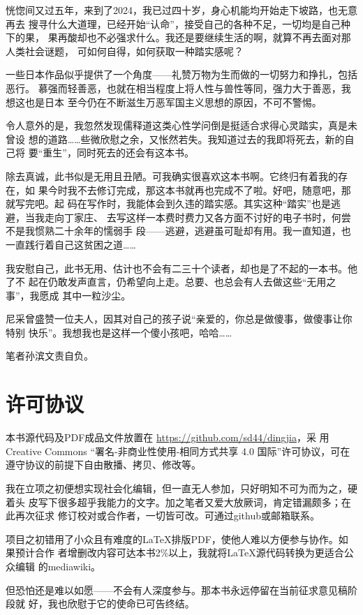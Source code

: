恍惚间又过五年，来到了2024，我已过四十岁，身心机能均开始走下坡路，也无意再去
搜寻什么大道理，已经开始“认命”，接受自己的各种不足，一切均是自己种下的果，
果再酸却也不必强求什么。我还是要继续生活的啊，就算不再去面对那人类社会谜题，
可如何自得，如何获取一种踏实感呢？

一些日本作品似乎提供了一个角度——礼赞万物为生而做的一切努力和挣扎，包括恶行。
慕强而轻善恶，也就在相当程度上将人性与兽性等同，强力大于善恶，我想这也是日本
至今仍在不断滋生万恶军国主义思想的原因，不可不警惕。

令人意外的是，我忽然发现儒释道这类心性学问倒是挺适合求得心灵踏实，真是未曾设
想的道路……些微欣慰之余，又怅然若失。我知道过去的我即将死去，新的自己将
要“重生”，同时死去的还会有这本书。

除去真诚，此书似是无用且丑陋。可我确实很喜欢这本书啊。它终归有着我的存在，如
果今时我不去修订完成，那这本书就再也完成不了啦。好吧，随意吧，那就写完吧。起
码在写作时，我能体会到久违的踏实感。其实这种“踏实”也是逃避，当我走向丁家庄、
去写这样一本费时费力又各方面不讨好的电子书时，何尝不是我惯熟二十余年的懦弱手
段——逃避，逃避虽可耻却有用。我一直知道，也一直践行着自己这贫困之道……

我安慰自己，此书无用、估计也不会有二三十个读者，却也是了不起的一本书。他了不
起在仍敢发声直言，仍希望向上走。总要、也总会有人去做这些“无用之事”，我愿成
其中一粒沙尘。


尼采曾盛赞一位夫人，因其对自己的孩子说“亲爱的，你总是做傻事，做傻事让你特别
快乐”。我想我也是这样一个傻小孩吧，哈哈……

笔者孙滨文责自负。

\section*{许可协议}

本书源代码及PDF成品文件放置在 \url{https://github.com/sd44/dingjia}，采
用 Creative Commons “署名-非商业性使用-相同方式共享 4.0 国际”许可协议，可在
遵守协议的前提下自由散播、拷贝、修改等。

我在立项之初便想实现社会化编辑，但一直无人参加，只好明知不可为而为之，硬着头
皮写下很多超乎我能力的文字。加之笔者又爱大放厥词，肯定错漏颇多；在此再次征求
修订校对或合作者，一切皆可改。可通过github或邮箱联系。

项目之初错用了小众且有难度的\LaTeX 排版PDF，使他人难以方便参与协作。如果预计合作
者增删改内容可达本书2\%以上，我就将\LaTeX 源代码转换为更适合公众编辑
的mediawiki。

但恐怕还是难以如愿——不会有人深度参与。那本书永远停留在当前征求意见稿阶段就
好，我也欣慰于它的使命已可告终结。

